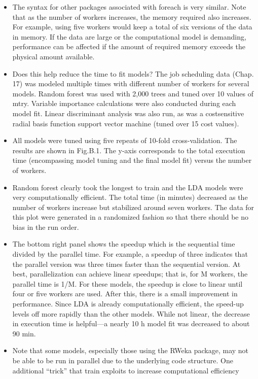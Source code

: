 \begin{itemize}
\item The syntax for other packages associated with foreach is very similar. Note
that as the number of workers increases, the memory required also increases.
For example, using five workers would keep a total of six versions of the data
in memory. If the data are large or the computational model is demanding,
performance can be affected if the amount of required memory exceeds the
physical amount available.
\item Does this help reduce the time to fit models? The job scheduling data
(Chap. 17) was modeled multiple times with different number of workers for
several models. Random forest was used with 2,000 trees and tuned over 10
values of mtry. Variable importance calculations were also conducted during
each model fit. Linear discriminant analysis was also run, as was a costsensitive
radial basis function support vector machine (tuned over 15 cost
values). 
\item All models were tuned using five repeats of 10-fold cross-validation.
The results are shown in Fig.B.1. The y-axis corresponds to the total execution
time (encompassing model tuning and the final model fit) versus the
number of workers. 
\item Random forest clearly took the longest to train and the
LDA models were very computationally efficient. The total time (in minutes)
decreased as the number of workers increase but stabilized around seven
workers. The data for this plot were generated in a randomized fashion so
that there should be no bias in the run order. 
\item The bottom right panel shows
the speedup which is the sequential time divided by the parallel time. For example,
a speedup of three indicates that the parallel version was three times
faster than the sequential version. At best, parallelization can achieve linear
speedups; that is, for M workers, the parallel time is 1/M. For these models,
the speedup is close to linear until four or five workers are used. After this,
there is a small improvement in performance. Since LDA is already computationally
efficient, the speed-up levels off more rapidly than the other models.
While not linear, the decrease in execution time is helpful—a nearly 10 h
model fit was decreased to about 90 min.
\item Note that some models, especially those using the RWeka package, may
not be able to be run in parallel due to the underlying code structure.
One additional “trick” that train exploits to increase computational efficiency

\end{itemize}
